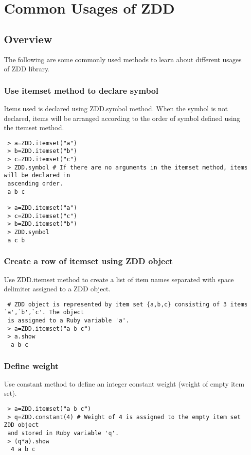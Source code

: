 

\chapter[Usage]{Common Usages of ZDD}

\section{Overview}

The following are some commonly used methods to learn about different usages of ZDD library. 

\subsection {Use itemset method to declare symbol} 

Items used is declared using ZDD.symbol method. When the symbol is not declared, items will be arranged according to the order of symbol defined using the itemset method.  
\begin{verbatim}
 > a=ZDD.itemset("a")
 > b=ZDD.itemset("b")
 > c=ZDD.itemset("c")
 > ZDD.symbol # If there are no arguments in the itemset method, items will be declared in 
 ascending order. 
 a b c

 > a=ZDD.itemset("a")
 > c=ZDD.itemset("c")
 > b=ZDD.itemset("b")
 > ZDD.symbol
 a c b
\end{verbatim}

\subsection {Create a row of itemset using ZDD object} 

Use ZDD.itemset method to create a list of item names separated with space delimiter assigned to a ZDD object. 
 \begin{verbatim}
 # ZDD object is represented by item set {a,b,c} consisting of 3 items `a',`b',`c'. The object 
 is assigned to a Ruby variable 'a'.
 > a=ZDD.itemset("a b c")
 > a.show
  a b c
\end{verbatim}
 
 \subsection{Define weight}
 
Use constant method to define an integer constant weight (weight of empty item set).
 \begin{verbatim}
 > a=ZDD.itemset("a b c")
 > q=ZDD.constant(4) # Weight of 4 is assigned to the empty item set ZDD object 
 and stored in Ruby variable 'q'. 
 > (q*a).show
  4 a b c
 \end{verbatim}
 
